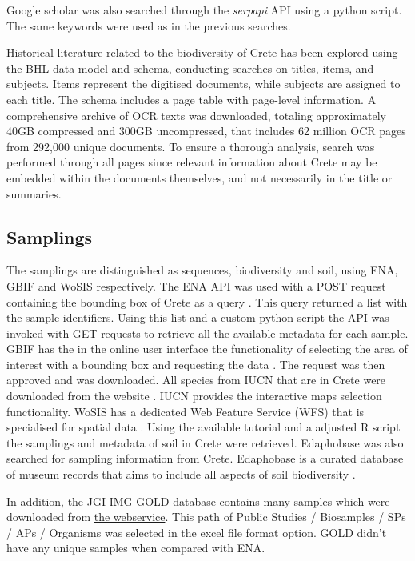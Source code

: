 Google scholar was also searched through the \textit{serpapi} API using
a python script. The same keywords were used as in the previous searches.

Historical literature related to the biodiversity of Crete has been explored
using the BHL data model and schema, conducting searches on titles, items, and subjects.
Items represent the digitised documents, while subjects are assigned to each title.
The schema includes a page table with page-level information.
A comprehensive archive of OCR texts was downloaded, totaling approximately
40GB compressed and 300GB uncompressed, that includes 62 million OCR pages from 292,000 unique documents.
To ensure a thorough analysis, search was performed through all pages since
relevant information about Crete may be embedded within the documents
themselves, and not necessarily in the title or summaries.

\subsection{Samplings}\label{crete_samplings}

The samplings are distinguished as sequences, biodiversity and soil, using ENA, GBIF and WoSIS respectively.
The ENA API was used with a POST request containing the bounding box of Crete as a query \parencite{Yuan2023}. This 
query returned a list with the sample identifiers. Using this list and a custom python script the API
was invoked with GET requests to retrieve all the available metadata for each sample.
GBIF has the in the online user interface the functionality of selecting the area of interest with a bounding box and requesting
the data \parencite{noauthor_gbif_nodate}. The request was then approved and was downloaded. All species 
from IUCN that are in Crete were downloaded from the website \parencite{iucn2024}. IUCN provides the 
interactive maps selection functionality. 
WoSIS has a dedicated Web Feature Service (WFS) that is specialised for spatial data \parencite{Batjes2024}. 
Using the available tutorial and a adjusted R script the samplings and metadata of 
soil in Crete were retrieved.
Edaphobase was also searched for sampling information from Crete. Edaphobase is
a curated database of museum records that aims to include all aspects of soil biodiversity \parencite{BURKHARDT20143}.

In addition, the JGI IMG GOLD database contains many samples which were downloaded from \href{https://gold.jgi.doe.gov/downloads}{the webservice}.
This path of Public Studies / Biosamples / SPs / APs / Organisms was selected in the excel file format option. 
GOLD didn't have any unique samples when compared with ENA.

